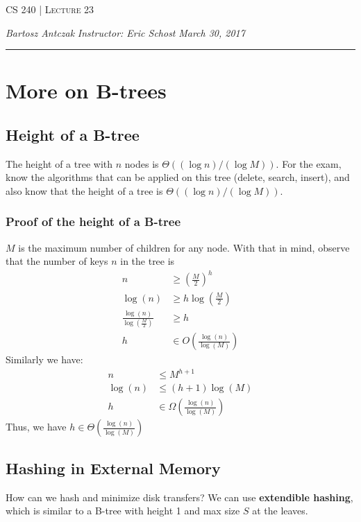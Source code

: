 \documentclass{report}
\newcommand{\lectureNum}{23}
\newcommand{\curDate}{March 30, 2017}
\newcommand{\course}{CS 240}
\begin{document}
\begin{center}
\begin{Large}
\textsc{\course{} | Lecture \lectureNum{}}
\end{Large}
\end{center} 
\noindent \textit{Bartosz Antczak} \hfill
\textit{Instructor: Eric Schost} \hfill
\textit{\curDate{}}
\rule{\textwidth}{0.4pt}
\section{More on B-trees}
\subsection{Height of a B-tree}
The height of a tree with $n$ nodes is $\Theta((\log n)/(\log M))$.
For the exam, know the algorithms that can be applied on this tree (delete, search, insert), and also know that the height of a tree is $\Theta((\log n)/(\log M))$.
\subsubsection{Proof of the height of a B-tree}
$M$ is the maximum number of children for any node. With that in mind, observe that the number of keys $n$ in the tree is
\begin{align*}
n &\geq {\left(\frac{M}{2}\right)}^h \\
\log(n) &\geq h \log \left(\frac{M}{2}\right) \\
\frac{\log(n)}{\log(\frac{M}{2})} &\geq h\\
h &\in O\left(\frac{\log(n)}{\log(M)}\right)
\end{align*}
Similarly we have:
\begin{align*}
n &\leq M^{h+1} \\
\log(n) &\leq (h+1) \log(M) \\
h &\in \Omega\left(\frac{\log(n)}{\log(M)}\right)
\end{align*}
Thus, we have $h \in \Theta\left(\frac{\log(n)}{\log(M)}\right)$
\subsection{Hashing in External Memory}
How can we hash and minimize disk transfers? We can use \textbf{extendible hashing}, which is similar to a B-tree with height 1 and max size $S$ at the leaves.
\end{document}
